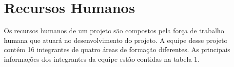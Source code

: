 \section[Recursos Humanos]{Recursos Humanos}

Os recursos humanos de um projeto são compostos pela força de trabalho humana que atuará no desenvolvimento do projeto. A equipe desse projeto contém 16 integrantes de quatro áreas de formação diferentes. As principais informações dos integrantes da equipe estão contidas na tabela 1.

